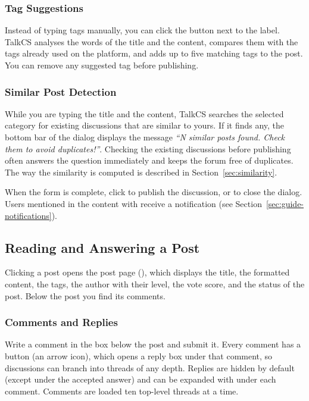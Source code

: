 \subsubsection*{Tag Suggestions}

Instead of typing tags manually, you can click the  button next to the
 label. TalkCS analyses the words of the title and the content, compares them with the
tags already used on the platform, and adds up to five matching tags to the post. You
can remove any suggested tag before publishing.

\subsubsection*{Similar Post Detection}

While you are typing the title and the content, TalkCS searches the selected category
for existing discussions that are similar to yours. If it finds any, the bottom bar of
the dialog displays the message \emph{``N similar posts found. Check them to avoid
duplicates!''}. Checking the existing discussions before publishing often answers the
question immediately and keeps the forum free of duplicates. The way the similarity is computed is described in
Section~\ref{sec:similarity}.

When the form is complete, click  to publish the discussion, or
 to close the dialog. Users mentioned in the content with
 receive a notification (see Section~\ref{sec:guide-notifications}).


\subsection{Reading and Answering a Post}

Clicking a post opens the post page (), which displays the title,
the formatted content, the tags, the author with their level, the vote score, and the
status of the post. Below the post you find its comments.

\subsubsection*{Comments and Replies}

Write a comment in the  box below the post and submit it. Every
comment has a  button (an arrow icon), which opens a reply box under that comment, so discussions can
branch into threads of any depth. Replies are hidden by default (except under the
accepted answer) and can be expanded with  under each comment. Comments are loaded ten top-level threads at a time.

